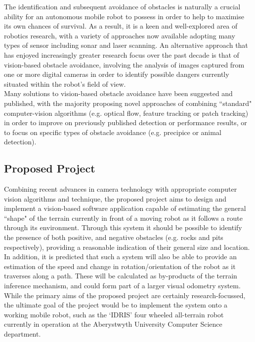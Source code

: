 \documentclass[10pt,fleqn,twoside]{article}
\begin{document}
The identification and subsequent avoidance of obstacles is naturally a crucial ability for an autonomous mobile robot to possess in order to help to maximise its own chances of survival. As a result, it is a keen and well-explored area of robotics research, with a variety of approaches now available adopting many types of sensor including sonar and laser scanning. An alternative approach that has enjoyed increasingly greater research focus over the past decade is that of vision-based obstacle avoidance, involving the analysis of images captured from one or more digital cameras in order to identify possible dangers currently situated within the robot's field of view. \\

Many solutions to vision-based obstacle avoidance have been suggested and published, with the majority proposing novel approaches of combining ``standard" computer-vision algorithms (e.g. optical flow, feature tracking or patch tracking) in order to improve on previously published detection or performance results, or to focus on specific types of obstacle avoidance (e.g. precipice or animal detection).

\subsection{Proposed Project}

Combining recent advances in camera technology with appropriate computer vision algorithms and technique, the proposed project aims to design and implement a vision-based software application capable of estimating the general ``shape" of the terrain currently in front of a moving robot as it follows a route through its environment. Through this system it should be possible to identify the presence of both positive, and negative obstacles (e.g. rocks and pits respectively), providing a reasonable indication of their general size and location. \\

In addition, it is predicted that such a system will also be able to provide an estimation of the speed and change in rotation/orientation of the robot as it traverses along a path. These will be calculated as by-products of the terrain inference mechanism, and could form part of a larger visual odometry system. \\

While the primary aims of the proposed project are certainly research-focussed, the ultimate goal of the project would be to implement the system onto a working mobile robot, such as the `IDRIS' four wheeled all-terrain robot currently in operation at the Aberystwyth University Computer Science department. \\
\end{document}
